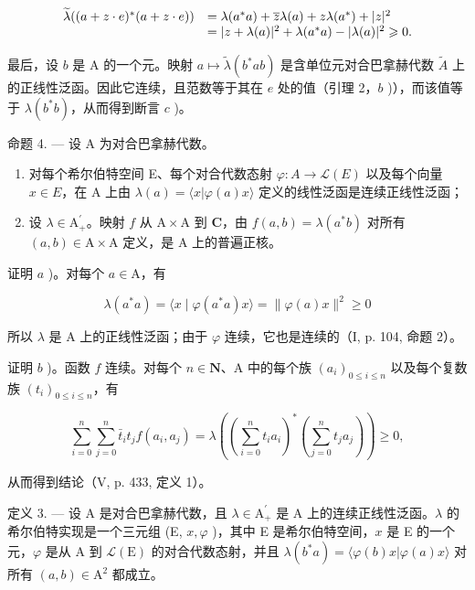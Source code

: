 \[
\begin{array}{r l} \widetilde {\lambda} ((a + z \cdot e) ^ {*} (a + z \cdot e)) & = \lambda (a ^ {*} a) + \overline {{z}} \lambda (a) + z \lambda (a ^ {*}) + | z | ^ {2} \\ & = | z + \lambda (a) | ^ {2} + \lambda (a ^ {*} a) - | \lambda (a) | ^ {2} \geqslant 0. \end{array}
\]

最后，设 \(b\) 是 A 的一个元。映射 \(a \mapsto \widetilde{\lambda}(b^{*}ab)\) 是含单位元对合巴拿赫代数 \(\widetilde{A}\) 上的正线性泛函。因此它连续，且范数等于其在 \(e\) 处的值（引理 2，\(b\) )），而该值等于 \(\lambda(b^{*}b)\)，从而得到断言 \(c\) )。

命题 4. — 设 A 为对合巴拿赫代数。

\begin{enumerate}
\def\labelenumi{\alph{enumi})}
\item
  对每个希尔伯特空间 E、每个对合代数态射 \(\varphi\colon A\to\mathcal{L}(E)\) 以及每个向量 \(x\in E\)，在 A 上由 \(\lambda(a)=\langle x|\varphi(a)x\rangle\) 定义的线性泛函是连续正线性泛函；
\item
  设 \(\lambda \in \mathrm{A}_{+}^{\prime}\)。映射 \(f\) 从 \(\mathrm{A} \times \mathrm{A}\) 到 \(\mathbf{C}\)，由 \(f(a, b) = \lambda (a^{*}b)\) 对所有 \((a, b) \in \mathrm{A} \times \mathrm{A}\) 定义，是 \(\mathrm{A}\) 上的普遍正核。
\end{enumerate}

证明 \(a\) )。对每个 \(a \in \mathrm{A}\)，有

\[
\lambda (a ^ {*} a) = \langle x \mid \varphi (a ^ {*} a) x \rangle = \| \varphi (a) x \| ^ {2} \geqslant 0
\]

所以 \(\lambda\) 是 A 上的正线性泛函；由于 \(\varphi\) 连续，它也是连续的（I, p. 104, 命题 2）。

证明 \(b\) )。函数 \(f\) 连续。对每个 \(n \in \mathbf{N}\)、A 中的每个族 \((a_i)_{0 \leqslant i \leqslant n}\) 以及每个复数族 \((t_i)_{0 \leqslant i \leqslant n}\)，有

\[
\sum_ {i = 0} ^ {n} \sum_ {j = 0} ^ {n} \bar {t} _ {i} t _ {j} f (a _ {i}, a _ {j}) = \lambda \left(\left(\sum_ {i = 0} ^ {n} t _ {i} a _ {i}\right) ^ {*} \left(\sum_ {j = 0} ^ {n} t _ {j} a _ {j}\right)\right) \geqslant 0,
\]

从而得到结论（V, p. 433, 定义 1）。

定义 3. — 设 A 是对合巴拿赫代数，且 \(\lambda \in \mathrm{A}_{+}^{\prime}\) 是 A 上的连续正线性泛函。\(\lambda\) 的希尔伯特实现是一个三元组 (E, \(x, \varphi\) )，其中 E 是希尔伯特空间，\(x\) 是 E 的一个元，\(\varphi\) 是从 A 到 \(\mathcal{L}(\mathrm{E})\) 的对合代数态射，并且 \(\lambda(b^{*}a) = \langle \varphi(b)x | \varphi(a)x \rangle\) 对所有 \((a,b) \in \mathrm{A}^{2}\) 都成立。


